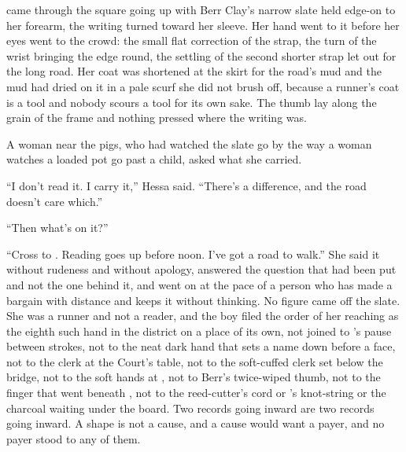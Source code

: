 \scenebreak

 came through the square going up  with Berr Clay's narrow slate held edge-on to her forearm, the writing turned toward her sleeve. Her hand went to it before her eyes went to the crowd: the small flat correction of the strap, the turn of the wrist bringing the edge round, the settling of the second shorter strap let out for the long road. Her coat was shortened at the skirt for the road's mud and the mud had dried on it in a pale scurf she did not brush off, because a runner's coat is a tool and nobody scours a tool for its own sake. The thumb lay along the grain of the frame and nothing pressed where the writing was.

A woman near the pigs, who had watched the slate go by the way a woman watches a loaded pot go past a child, asked what she carried.

“I don't read it. I carry it,” Hessa said. “There's a difference, and the road doesn't care which.”

“Then what's on it?”

“Cross to . Reading goes up before noon. I've got a road to walk.” She said it without rudeness and without apology, answered the question that had been put and not the one behind it, and went on at the pace of a person who has made a bargain with distance and keeps it without thinking. No figure came off the slate. She was a runner and not a reader, and the boy filed the order of her reaching as the eighth such hand in the district on a place of its own, not joined to 's pause between strokes, not to the neat dark hand that sets a name down before a face, not to the clerk at the Court's table, not to the soft-cuffed clerk set below the bridge, not to the soft hands at , not to Berr's twice-wiped thumb, not to the finger that went beneath , not to the reed-cutter's cord or 's knot-string or the charcoal waiting under the board. Two records going inward are two records going inward. A shape is not a cause, and a cause would want a payer, and no payer stood to any of them.

